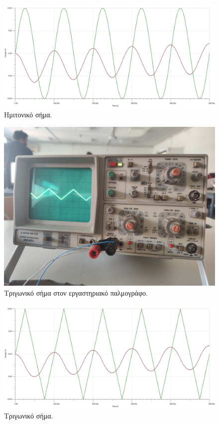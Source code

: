 \documentclass[12pt]{article}
\begin{document}
\begin{figure}[H]
	\centering
	\includegraphics[width=\linewidth]{./res/sine.jpg}
	\caption{Ημιτονικό σήμα.}
\end{figure}

\begin{figure}[H]
	\centering
	\includegraphics[width=\linewidth]{./res/triang_real.jpg}
	\caption{Τριγωνικό σήμα στον εργαστηριακό παλμογράφο.}
\end{figure}

\begin{figure}[H]
	\centering
	\includegraphics[width=\linewidth]{./res/triang.jpg}
	\caption{Τριγωνικό σήμα.}
\end{figure}
\end{document}

